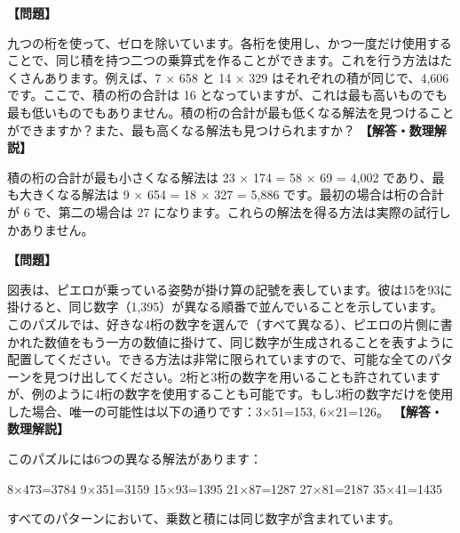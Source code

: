 \documentclass[10pt,a4paper,oneside,openany]{ltjsbook}
\begin{document}
\begin{tcolorbox}[colback=softblue,colframe=primaryblue,title=\textbf{第 83 問：数字による乗法 （原題: DIGITAL MULTIPLICATION.）},arc=2mm,boxrule=1pt,breakable]
\textbf{【問題】}\par\vspace{0.3em}
九つの桁を使って、ゼロを除いています。各桁を使用し、かつ一度だけ使用することで、同じ積を持つ二つの乗算式を作ることができます。これを行う方法はたくさんあります。例えば、7 × 658 と 14 × 329 はそれぞれの積が同じで、4,606 です。ここで、積の桁の合計は 16 となっていますが、これは最も高いものでも最も低いものでもありません。積の桁の合計が最も低くなる解法を見つけることができますか？また、最も高くなる解法も見つけられますか？
\tcblower
\textbf{【解答・数理解説】}\par\vspace{0.3em}
積の桁の合計が最も小さくなる解法は 23 × 174 = 58 × 69 = 4,002 であり、最も大きくなる解法は 9 × 654 = 18 × 327 = 5,886 です。最初の場合は桁の合計が 6 で、第二の場合は 27 になります。これらの解法を得る方法は実際の試行しかありません。
\end{tcolorbox}

\begin{tcolorbox}[colback=softblue,colframe=primaryblue,title=\textbf{第 84 問：ピエロのパズル （原題: THE PIERROT'S PUZZLE.）},arc=2mm,boxrule=1pt,breakable]
\textbf{【問題】}\par\vspace{0.3em}
図表は、ピエロが乗っている姿勢が掛け算の記號を表しています。彼は15を93に掛けると、同じ数字（1,395）が異なる順番で並んでいることを示しています。このパズルでは、好きな4桁の数字を選んで（すべて異なる）、ピエロの片側に書かれた数値をもう一方の数値に掛けて、同じ数字が生成されることを表すように配置してください。できる方法は非常に限られていますので、可能な全てのパターンを見つけ出してください。2桁と3桁の数字を用いることも許されていますが、例のように4桁の数字を使用することも可能です。もし3桁の数字だけを使用した場合、唯一の可能性は以下の通りです：3×51=153, 6×21=126。
\tcblower
\textbf{【解答・数理解説】}\par\vspace{0.3em}
このパズルには6つの異なる解法があります：

8×473=3784
9×351=3159
15×93=1395
21×87=1287
27×81=2187
35×41=1435

すべてのパターンにおいて、乗数と積には同じ数字が含まれています。
\end{tcolorbox}
\end{document}
